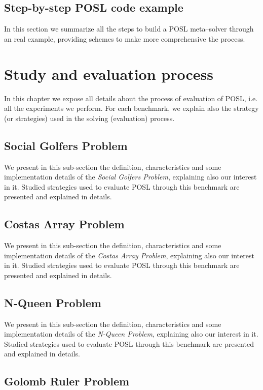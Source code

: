 \documentclass[a4paper]{book} %
\newcommand{\posl}{{\sc POSL}}
\begin{document}
\section{Step-by-step \posl{} code example}

In this section we summarize all the steps to build a \posl{} meta--solver through an real example, providing schemes to make more comprehensive the process.



\chapter{Study and evaluation process}

In this chapter we expose all details about the process of evaluation of \posl{}, i.e. all the experiments we perform. For each benchmark, we explain also the strategy (or strategies) used in the solving (evaluation) process.

\newcommand{\benchbody}[1]{We present in this sub-section the definition, characteristics and some implementation details of the \textit{#1 Problem}, explaining also our interest in it. Studied strategies used to evaluate \posl{} through this benchmark are presented and explained in details.}

\section{Social Golfers Problem}

\benchbody{Social Golfers}

\section{Costas Array Problem}

\benchbody{Costas Array}

\section{N-Queen Problem}

\benchbody{N-Queen}

\section{Golomb Ruler Problem}
\end{document}
